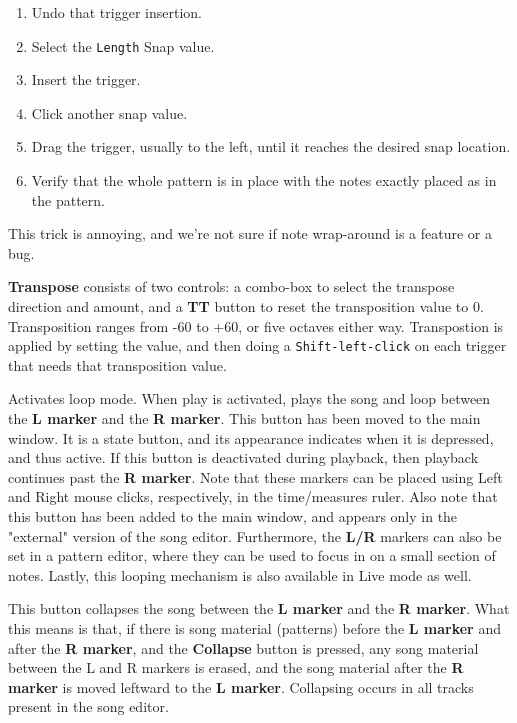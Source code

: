    \begin{enumerate}
      \item Undo that trigger insertion.
      \item Select the \texttt{Length} Snap value.
      \item Insert the trigger.
      \item Click another snap value.
      \item Drag the trigger, usually to the left, until it reaches the
         desired snap location.
      \item Verify that the whole pattern is in place with the notes exactly
         placed as in the pattern.
   \end{enumerate}

   This trick is annoying, and we're not sure if note wrap-around
   is a feature or a bug.

   \textbf{Transpose} consists of two controls:
   a combo-box to select the transpose direction and amount,
   and a \textbf{TT} button to reset the transposition value to 0.
   Transposition ranges from -60 to +60, or five octaves either way.
   Transpostion is applied by setting the value, and then doing
   a \texttt{Shift-left-click} on each trigger that needs that
   transposition value.

   Activates loop mode. When play is activated, plays the song and loop
   between the
   \textbf{L marker} and the \textbf{R marker}.
   This button has been moved to the main window.
   It is a state button, and its appearance indicates when it is
   depressed, and thus active.
   If this button is deactivated during playback, then playback
   continues past the \textbf{R marker}.
   Note that these markers can be placed using Left
   and Right mouse clicks, respectively, in the time/measures ruler.
   Also note that this button has been added to the main
   window, and appears only in the "external" version of the song editor.
   Furthermore, the \textbf{L/R} markers can also be set in a pattern editor,
   where they can be used to focus in on a small section of notes.
   Lastly, this looping mechanism is also available in Live mode as well.

   This button collapses the song between the \textbf{L marker} and the
   \textbf{R marker}.
   What this means is that, if there is song material (patterns) before the
   \textbf{L marker} and after the \textbf{R marker},
   and the \textbf{Collapse} button is
   pressed, any song material between the L and R markers is erased, and
   the song material after the \textbf{R marker} is moved leftward to
   the \textbf{L marker}.
   Collapsing occurs in all tracks present in the song editor.

